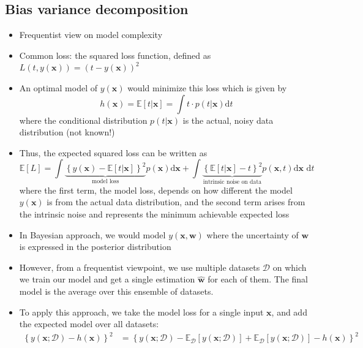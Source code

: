 \subsection{Bias variance decomposition}
\begin{itemize}
	\item Frequentist view on model complexity
	\item Common loss: the squared loss function, defined as $L\left(t, y\left(\bm{x}\right)\right) = \left(t - y\left(\bm{x}\right)\right)^2$
	\item An optimal model of $y\left(\bm{x}\right)$ would minimize this loss which is given by $$h(\bm{x}) = \mathbb{E}\left[t|\bm{x}\right] = \int t\cdot p\left(t|\bm{x}\right) \text{d}t$$
	where the conditional distribution $p\left(t|\bm{x}\right)$ is the actual, noisy data distribution (not known!)
	\item Thus, the expected squared loss can be written as
	$$\mathbb{E}\left[L\right] = \int\underbrace{\left\{y(\bm{x}) - \mathbb{E}\left[t|\bm{x}\right]\right\}^2}_{\text{model loss}} p(\bm{x}) \text{d}\bm{x} + \int\underbrace{\left\{\mathbb{E}\left[t|\bm{x}\right] - t\right\}^2}_{\text{intrinsic noise on data}} p(\bm{x},t) \text{d}\bm{x}\text{ d}t$$
	where the first term, the model loss, depends on how different the model $y(\bm{x})$ is from the actual data distribution, and the second term arises from the intrinsic noise and represents the minimum achievable expected loss
	\item In Bayesian approach, we would model $y(\bm{x}, \bm{w})$ where the uncertainty of $\bm{w}$ is expressed in the posterior distribution
	\item However, from a frequentist viewpoint, we use multiple datasets $\mathcal{D}$ on which we train our model and get a single estimation $\bm{\hat{w}}$ for each of them. The final model is the average over this ensemble of datasets.
	\item To apply this approach, we take the model loss for a single input $\bm{x}$, and add the expected model over all datasets:
	\begin{equation*}
		\begin{split}
			\left\{y\left(\bm{x};\mathcal{D}\right) - h\left(\bm{x}\right)\right\}^2 & = \left\{y\left(\bm{x};\mathcal{D}\right) - \mathbb{E}_{\mathcal{D}}\left[y\left(\bm{x};\mathcal{D}\right)\right] + \mathbb{E}_{\mathcal{D}}\left[y\left(\bm{x};\mathcal{D}\right)\right] - h\left(\bm{x}\right)\right\}^2\\

\end{split}
\end{equation*}
\end{itemize}
